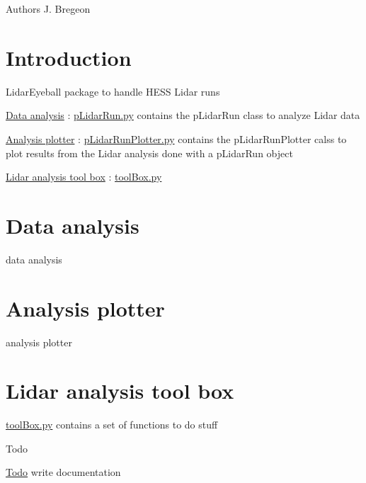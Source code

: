 \begin{DoxyAuthor}{Authors}
J. Bregeon
\end{DoxyAuthor}
\hypertarget{index_intro}{}\section{Introduction}\label{index_intro}
Lidar\-Eyeball package to handle H\-E\-S\-S Lidar runs


\begin{DoxyItemize}
\item \hyperlink{index_pLidarRun}{Data analysis} \-: \hyperlink{pLidarRun_8py}{p\-Lidar\-Run.\-py} contains the p\-Lidar\-Run class to analyze Lidar data
\item \hyperlink{index_pLidarRunPlotter}{Analysis plotter} \-: \hyperlink{pLidarRunPlotter_8py}{p\-Lidar\-Run\-Plotter.\-py} contains the p\-Lidar\-Run\-Plotter calss to plot results from the Lidar analysis done with a p\-Lidar\-Run object
\item \hyperlink{index_tools}{Lidar analysis tool box} \-: \hyperlink{toolBox_8py}{tool\-Box.\-py}
\end{DoxyItemize}\hypertarget{index_pLidarRun}{}\section{Data analysis}\label{index_pLidarRun}
data analysis\hypertarget{index_pLidarRunPlotter}{}\section{Analysis plotter}\label{index_pLidarRunPlotter}
analysis plotter\hypertarget{index_tools}{}\section{Lidar analysis tool box}\label{index_tools}
\hyperlink{toolBox_8py}{tool\-Box.\-py} contains a set of functions to do stuff



 \begin{DoxyRefDesc}{Todo}
\item[\hyperlink{todo__todo000001}{Todo}]write documentation\end{DoxyRefDesc}
